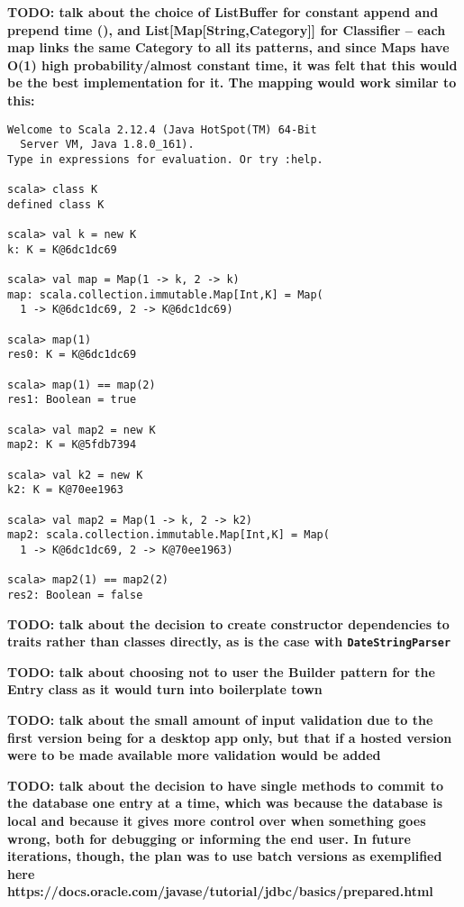 \textbf{TODO: talk about the choice of ListBuffer for constant append and
prepend time (\cite[][location~15415]{odersky2016scala}), and
List[Map[String,Category]] for Classifier -- each map links the same Category
to all its patterns, and since Maps have O(1) high probability/almost constant
time, it was felt that this would be the best implementation for it. The
mapping would work similar to this:} 

\begin{lstlisting}
Welcome to Scala 2.12.4 (Java HotSpot(TM) 64-Bit 
  Server VM, Java 1.8.0_161).
Type in expressions for evaluation. Or try :help.

scala> class K
defined class K

scala> val k = new K
k: K = K@6dc1dc69

scala> val map = Map(1 -> k, 2 -> k)
map: scala.collection.immutable.Map[Int,K] = Map(
  1 -> K@6dc1dc69, 2 -> K@6dc1dc69)

scala> map(1)
res0: K = K@6dc1dc69

scala> map(1) == map(2)
res1: Boolean = true

scala> val map2 = new K
map2: K = K@5fdb7394

scala> val k2 = new K
k2: K = K@70ee1963

scala> val map2 = Map(1 -> k, 2 -> k2)
map2: scala.collection.immutable.Map[Int,K] = Map(
  1 -> K@6dc1dc69, 2 -> K@70ee1963)

scala> map2(1) == map2(2)
res2: Boolean = false

\end{lstlisting}

\textbf{TODO: talk about the decision to create constructor dependencies to
traits rather than classes directly, as is the case with
\texttt{DateStringParser}}

\textbf{TODO: talk about choosing not to user the Builder pattern for the Entry
class as it would turn into boilerplate town}

\textbf{TODO: talk about the small amount of input validation due to the first
version being for a desktop app only, but that if a hosted version were to be
made available more validation would be added}

\textbf{TODO: talk about the decision to have single methods to commit to the
database one entry at a time, which was because the database is local and
because it gives more control over when something goes wrong, both for
debugging or informing the end user. In future iterations, though, the plan was
to use batch versions as exemplified here
https://docs.oracle.com/javase/tutorial/jdbc/basics/prepared.html}

